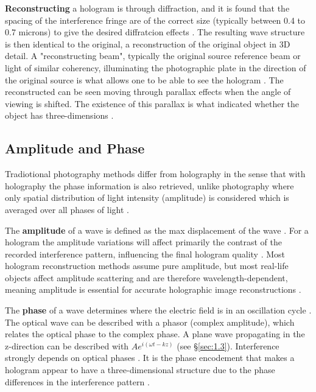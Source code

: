 \documentclass[12pt]{article}
\begin{document}
\textbf{Reconstructing} a hologram is through diffraction, and it is found that the spacing of the interference fringe are of the correct size (typically between 0.4 to 0.7 microns) to give the desired diffratcion effects 
\cite{UCDholo}.
The resulting wave structure is then identical to the original, a reconstruction of the original object in 3D detail.
A "reconstructing beam", typically the original source reference beam or light of similar coherency, illuminating the photographic plate in the direction of the original source is what allows one to be able to see the hologram
\cite{UCDholo}.
The reconstructed can be seen moving through parallax effects when the angle of viewing is shifted. The existence of this parallax is what indicated whether the object has three-dimensions \cite{UCDholo}.

\vspace{1cm}

\subsection{Amplitude and Phase} \label{sec:1.2}

Tradiotional photography methods differ from holography in the sense that with holography the phase information is also retrieved, unlike photography where only spatial distribution of light intensity (amplitude) is considered which
is averaged over all phases of light \cite{collier2013optical}.

The \textbf{amplitude} of a wave is defined as the max displacement of the wave \cite{britlight}.
For a hologram the amplitude variations will affect primarily the contrast of the recorded interference pattern, influencing the final hologram quality \cite{UCDholo,latychevskaia2009simultaneous}.
Most hologram reconstruction methods assume pure amplitude, but most real-life objects affect amplitude scattering and are therefore wavelength-dependent, 
meaning amplitude is essential for accurate holographic image reconstructions \cite{latychevskaia2009simultaneous}.

The \textbf{phase} of a wave determines where the electric field is in an oscillation cycle \cite{Paschotta_2018_optical_phase}.
The optical wave can be described with a phasor (complex amplitude), which relates the optical phase to the complex phase. 
A plane wave propagating in the z-direction can be described with $Ae^{i(\omega t - kz)}$ (see §\ref{sec:1.3}).
Interference strongly depends on optical phases \cite{Paschotta_2018_optical_phase}.
It is the phase encodement that makes a hologram appear to have a three-dimensional structure due to the phase differences in the interference pattern \cite{Paschotta_2018_optical_phase}.
\end{document}
